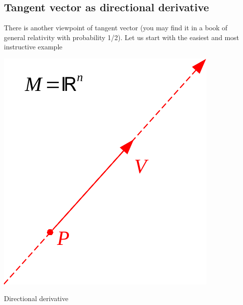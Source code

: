\documentclass[../main.tex]{subfiles}
\begin{document}
\subsection{Tangent vector as directional derivative}
There is another viewpoint of tangent vector (you may find it in a book of general relativity with probability 1/2). Let us start with the easiest and most instructive example
\begin{marginfigure}
	\includegraphics{images/direc_der.pdf}
	\caption[Directional derivative]{Directional derivative}
\end{marginfigure}
\end{document}
